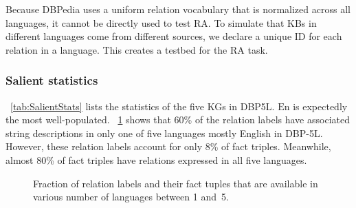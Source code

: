 \documentclass[11pt]{article}
\def\En{\ensuremath{\text{En}}}
\begin{document}
Because DBPedia uses a uniform relation vocabulary that is normalized across all languages, it cannot be directly used to test RA. To simulate that KBs in different languages come from different sources, we declare a unique ID for each relation in a language. This creates a testbed for the RA task.


\begin{table}
\centering
{}
\caption{Salient statistics of KGs.}
\label{tab:SalientStats}
\end{table}


\subsubsection{Salient statistics}

\tablename~\ref{tab:SalientStats} lists the statistics of the five KGs in DBP5L.  \En{} is expectedly the most well-populated.
\figurename~\ref{fig:RelDist} shows that 60\% of the relation labels have associated string descriptions in only one of five languages mostly English in DBP-5L.  However, these relation labels account for only 8\% of fact triples.  Meanwhile, almost 80\% of fact triples have relations expressed in all five languages.


\begin{figure}[h]
\centering
{}
\caption{Fraction of relation labels and their fact tuples that are available in various number of languages between 1 and~5.}
\label{fig:RelDist}
\end{figure}  
\end{document}
